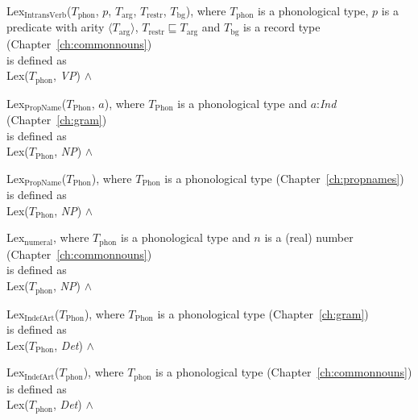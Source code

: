 Lex$_{\mathrm{IntransVerb}}$($T_{\mathrm{phon}}$, $p$,
  $T_{\mathrm{arg}}$, $T_{\mathrm{restr}}$, $T_{\mathrm{bg}}$),
  where $T_{\mathrm{phon}}$ is a phonological type, $p$ is a predicate
  with arity $\langle T_{\mathrm{arg}}\rangle$,
  $T_{\mathrm{restr}}\sqsubseteq T_{\mathrm{arg}}$ and
  $T_{\mathrm{bg}}$ is a record type (Chapter~\ref{ch:commonnouns})\\ 
is defined as\\
Lex($T_{\mathrm{phon}}$, \textit{VP}) \d{$\wedge$} 


Lex$_{\mathrm{PropName}}$($T_{\mathrm{Phon}}$, $a$), where
$T_{\mathrm{Phon}}$ is a phonological type and $a$:\textit{Ind}
(Chapter~\ref{ch:gram}) \\
is defined as \\
Lex($T_{\mathrm{Phon}}$, \textit{NP}) \d{$\wedge$}

Lex$_{\mathrm{PropName}}$($T_{\mathrm{Phon}}$), where
$T_{\mathrm{Phon}}$ is a phonological type
(Chapter~\ref{ch:propnames}) \\
is defined as \\
Lex($T_{\mathrm{Phon}}$, \textit{NP}) \d{$\wedge$}

Lex$_{\mathrm{numeral}}$, where
$T_{\mathrm{phon}}$ is a phonological type  and $n$ is a (real) number
(Chapter~\ref{ch:commonnouns}) \\
is defined as \\
Lex($T_{\mathrm{phon}}$, \textit{NP}) \d{$\wedge$} 

Lex$_{\mathrm{IndefArt}}$($T_{\mathrm{Phon}}$), where
$T_{\mathrm{Phon}}$ is a phonological type (Chapter~\ref{ch:gram}) \\
is defined as \\
Lex($T_{\mathrm{Phon}}$, \textit{Det}) \d{$\wedge$}

Lex$_{\mathrm{IndefArt}}$($T_{\mathrm{phon}}$), where
  $T_{\mathrm{phon}}$ is a phonological type
  (Chapter~\ref{ch:commonnouns}) \\
 is defined as\\ 
Lex($T_{\mathrm{phon}}$, \textit{Det}) \d{$\wedge$} 

